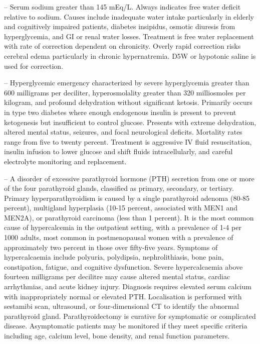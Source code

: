 -- Serum sodium greater than 145 mEq/L. Always indicates free water deficit relative to sodium. Causes include inadequate water intake particularly in elderly and cognitively impaired patients, diabetes insipidus, osmotic diuresis from hyperglycemia, and GI or renal water losses. Treatment is free water replacement with rate of correction dependent on chronicity. Overly rapid correction risks cerebral edema particularly in chronic hypernatremia. D5W or hypotonic saline is used for correction.

-- Hyperglycemic emergency characterized by severe hyperglycemia greater than 600 milligrams per deciliter, hyperosmolality greater than 320 milliosmoles per kilogram, and profound dehydration without significant ketosis. Primarily occurs in type two diabetes where enough endogenous insulin is present to prevent ketogenesis but insufficient to control glucose. Presents with extreme dehydration, altered mental status, seizures, and focal neurological deficits. Mortality rates range from five to twenty percent. Treatment is aggressive IV fluid resuscitation, insulin infusion to lower glucose and shift fluids intracellularly, and careful electrolyte monitoring and replacement.

-- A disorder of excessive parathyroid hormone (PTH) secretion from one or more of the four parathyroid glands, classified as primary, secondary, or tertiary. Primary hyperparathyroidism is caused by a single parathyroid adenoma (80-85 percent), multigland hyperplasia (10-15 percent, associated with MEN1 and MEN2A), or parathyroid carcinoma (less than 1 percent). It is the most common cause of hypercalcemia in the outpatient setting, with a prevalence of 1-4 per 1000 adults, most common in postmenopausal women with a prevalence of approximately two percent in those over fifty-five years. Symptoms of hypercalcaemia include polyuria, polydipsia, nephrolithiasis, bone pain, constipation, fatigue, and cognitive dysfunction. Severe hypercalcaemia above fourteen milligrams per decilitre may cause altered mental status, cardiac arrhythmias, and acute kidney injury. Diagnosis requires elevated serum calcium with inappropriately normal or elevated PTH. Localisation is performed with sestamibi scan, ultrasound, or four-dimensional CT to identify the abnormal parathyroid gland. Parathyroidectomy is curative for symptomatic or complicated disease. Asymptomatic patients may be monitored if they meet specific criteria including age, calcium level, bone density, and renal function parameters.


